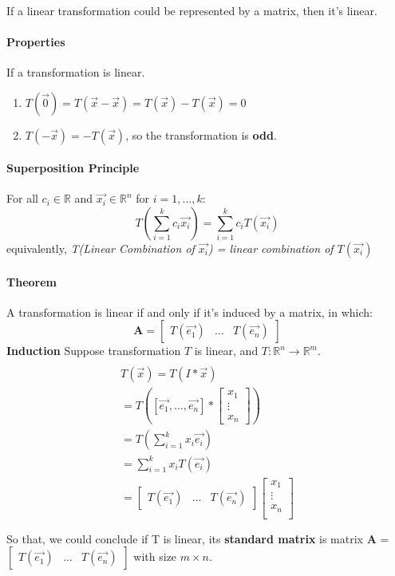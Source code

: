 \documentclass{article}
\begin{document}
	\paragraph{}If a linear transformation could be represented by a matrix, then it's linear.
	\paragraph{Properties} If a transformation is linear.
	\begin{enumerate}
		\item $T(\vec{0}) = T(\vec{x}-\vec{x}) = T(\vec{x})-T(\vec{x})=0$
		\item $T(-\vec{x}) = -T(\vec{x})$, so the transformation is \textbf{odd}.
	\end{enumerate}
	\paragraph{Superposition Principle} For all $c_i \in \mathbb{R}$ and $\vec{x_i} \in \mathbb{R}^n$ for $i=1,...,k$:
	\[
	T(\sum_{i=1}^{k} c_i\vec{x_i}) = \sum_{i=1}^{k} c_i T(\vec{x_i})
	\]
	equivalently, \emph{T(Linear Combination of $\vec{x_i}$) = linear combination of $T(\vec{x_i})$}
	\paragraph{Theorem} A transformation is linear if and only if it's induced by a matrix, in which:
	\[
	\textbf{A} = \begin{bmatrix}T(\vec{e_1}) & \dots & T(\vec{e_n})\end{bmatrix}
	\]
	\newline \textbf{Induction} Suppose transformation $T$ is linear, and $T:\mathbb{R}^n \rightarrow \mathbb{R}^m$.
	\begin{multline}
		\\
		T(\vec{x}) = T(I*\vec{x}) \\
		= T([\vec{e_1},\dots,\vec{e_n}]*\begin{bmatrix}x_1\\ \vdots \\ x_n \end{bmatrix}) \\
		= T(\sum_{i=1}^k x_i\vec{e_i}) \\
		= \sum_{i=1}^k x_i T(\vec{e_i}) \\
		= \begin{bmatrix}T(\vec{e_1}) & \dots & T(\vec{e_n}) \end{bmatrix} 
		\begin{bmatrix}
			x_1 \\
			\vdots \\
			x_n \\
		\end{bmatrix} \\
		\\
	\end{multline}
	So that, we could conclude if T is linear, its \textbf{standard matrix} is matrix \textbf{A} = $\begin{bmatrix}T(\vec{e_1}) & \dots & T(\vec{e_n}) \end{bmatrix}$ with size $m \times n$.
\end{document}
